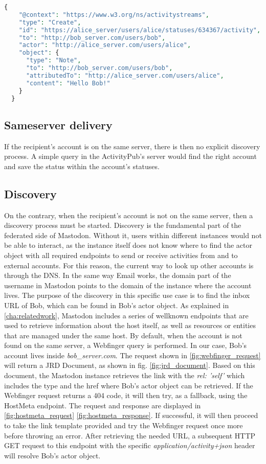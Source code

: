 \lstset{style=JSONStyle}
\begin{lstlisting}[language=PHP, caption=ActivityStreams create activity, label=fig:create_activity]
  {
    "@context": "https://www.w3.org/ns/activitystreams",
    "type": "Create",
    "id": "https://alice_server/users/alice/statuses/634367/activity",
    "to": "http://bob_server.com/users/bob",
    "actor": "http://alice_server.com/users/alice",
    "object": {
      "type": "Note",
      "to": "http://bob_server.com/users/bob",
      "attributedTo": "http://alice_server.com/users/alice",
      "content": "Hello Bob!"
    }
  }
\end{lstlisting}


\subsection{Same\-server delivery}
If the recipient's account is on the same server, there is then no explicit discovery process. A simple query in the ActivityPub's server would find the right account and save the status within the account's statuses. 


\subsection{Discovery}
On the contrary, when the recipient's account is not on the same server, then a discovery process must be started. Discovery is the fundamental part of the federated side of Mastodon. Without it, users within different instances would not be able to interact, as the instance itself does not know where to find the actor object with all required endpoints to send or receive activities from and to external accounts. For this reason, the current way to look up other accounts is through the DNS. In the same way Email works, the domain part of the username in Mastodon points to the domain of the instance where the account lives. The purpose of the discovery in this specific use case is to find the inbox URL of Bob, which can be found in Bob's actor object. As explained in \autoref{cha:relatedwork}, Mastodon includes a series of well\-known endpoints that are used to retrieve information about the host itself, as well as resources or entities that are managed under the same host. By default, when the account is not found on the same server, a Webfinger query is performed. 
In our case, Bob's account lives inside \emph{bob\_server.com}. The request shown in \ref{fig:webfinger_request} will return a JRD Document, as shown in fig. \ref{fig:jrd_document}. Based on this document, the Mastodon instance retrieves the link with the \emph{rel: 'self'} which includes the type and the href where Bob's actor object can be retrieved. If the Webfinger request returns a 404 code, it will then try, as a fallback, using the Host\-Meta endpoint. The request and response are displayed in \ref{fig:hostmeta_request} \ref{fig:hostmeta_response}. If successful, it will then proceed to take the link template provided and try the Webfinger request once more before throwing an error. After retrieving the needed URL, a subsequent HTTP GET request to this endpoint with the specific \emph{application/activity+json} header will resolve Bob's actor object. 

